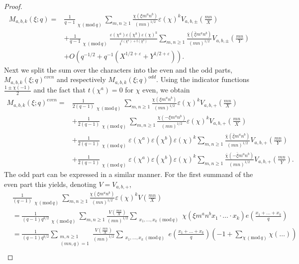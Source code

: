 \documentclass[12pt]{amsart}
\theoremstyle{plain}
\theoremstyle{definition}
\theoremstyle{remark}
\numberwithin{equation}{section}
\newcommand\sumst{\mathop{{\sum}^\ast}\limits}
\newcommand{\mods}[1]{\,(\mathrm{mod}\,{#1})}
\renewcommand{\geq}{\geqslant}
\begin{document}
\begin{proof}
\begin{align*}
M_{a,b,k}(\xi;q)=&\frac{1}{q-1}\sumst_{\chi\mods q}\sum_{m,n\geq 1}\frac{\chi(\xi m^an^b)}{(mn)^{1/2}}\varepsilon(\chi)^kV_{a,b,\pm}\left(\frac{mn}{X}\right)\\&+\frac{1}{q-1}\sumst_{\chi\mods q}\frac{\varepsilon(\chi^a)\varepsilon(\chi^b)\varepsilon(\chi)^k}{i^{t(\chi^a)+t(\chi^b)}}\sum_{m,n\geq 1}\frac{\bar \chi(\bar \xi m^an^b)}{(mn)^{1/2}}V_{a,b,\pm}\left(\frac{mn}{Y}\right)\\ & +O\left(q^{-1/2}+q^{-1}\left(X^{1/2+\varepsilon}+Y^{1/2+\varepsilon}\right)\right).
\end{align*}
Next we split the sum over the characters into the even and the odd parts, $M_{a,b,k}(\xi;q)^{even}$ and respectively $M_{a,b,k}(\xi;q)^{odd}$. Using the indicator functions $\frac{1\pm \chi(-1)}{2}$ and the fact that $t(\chi^a)=0$ for $\chi$ even, we obtain 
\begin{align*}
    M_{a,b,k}(\xi;q)^{even}=&\frac{1}{2(q-1)}\sumst_{\chi\mods q}\sum_{m,n\geq 1}\frac{\chi(\xi m^an^b)}{(mn)^{1/2}}\varepsilon(\chi)^kV_{a,b,+}\left(\frac{mn}{X}\right)\\&
    +\frac{1}{2(q-1)}\sumst_{\chi\mods q}\sum_{m,n\geq 1}\frac{\chi(-\xi m^an^b)}{(mn)^{1/2}}\varepsilon(\chi)^kV_{a,b,+}\left(\frac{mn}{X}\right)\\&
    +\frac{1}{2(q-1)}\sumst_{\chi\mods q}\varepsilon(\chi^a)\varepsilon(\chi^b)\varepsilon(\chi)^k\sum_{m,n\geq 1}\frac{\bar \chi(\bar \xi m^an^b)}{(mn)^{1/2}}V_{a,b,+}\left(\frac{mn}{Y}\right) \\&
    +\frac{1}{2(q-1)}\sumst_{\chi\mods q}\varepsilon(\chi^a)\varepsilon(\chi^b)\varepsilon(\chi)^k\sum_{m,n\geq 1}\frac{\bar \chi(-\bar \xi m^an^b)}{(mn)^{1/2}}V_{a,b,+}\left(\frac{mn}{Y}\right).
\end{align*}
The odd part can be expressed in a similar manner.
For the first summand of the even part this yields, denoting $V=V_{a,b,+}$, 
\begin{align*}
&  \frac{1}{(q-1)}\sumst_{\chi\mods q}\sum_{m,n\geq 1}\frac{\chi(\xi m^an^b)}{(mn)^{1/2}}\varepsilon(\chi)^kV\left(\frac{mn}{X}\right) \\
    & =\frac{1}{(q-1)q^{k/2}}\sumst_{\chi\mods q}\sum_{m,n\geq 1}\frac{V\left(\frac{mn}{X}\right)}{(mn)^{1/2}}\sum_{\substack{ x_1, \ldots,  x_k\mods q}}\chi( \xi m^an^bx_1\cdot \ldots \cdot  x_k)e\left(\frac{ x_1+\ldots+ x_k}{q}\right) \\
    & =\frac{1}{(q-1)q^{k/2}}\sum_{\substack{m,n\geq 1\\(mn,q)=1}}\frac{V\left(\frac{mn}{X}\right)}{(mn)^{1/2}}\sum_{\substack{ x_1, \ldots,  x_k\mods q}}e\left(\frac{ x_1+\ldots+ x_k}{q}\right)\left(-1+\sum_{\chi\mods q}\chi(\ldots)\right)\\

\end{align*}
\end{proof}
\end{document}
